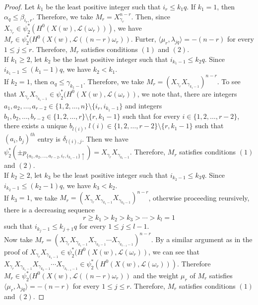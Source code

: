 \documentclass[12pt,reqno]{amsart}
\numberwithin{equation}{section}
\theoremstyle{definition}
\begin{document}
\begin{proof}
	Let $k_{1}$ be the least positive integer such that $i_{r}\leq k_{1}q$. If $k_{1}=1$, then $\alpha_{q}\leq \beta_{i_{r},r}$. Therefore, we take $M_{r}=X_{\gamma_{r}}^{n-r}$. Then, since $X_{\gamma_{r}}\in \psi_{2}^{*}(H^{0}(X(w),\mathcal{L}(\omega_{r})))$, we have $M_{r}\in \psi_{2}^{*}(H^{0}(X(w),\mathcal{L}((n-r)\omega_{r}))$. Furter, $\langle\mu_{r},\lambda_{jq}\rangle=-(n-r)$ for every $1\leq j\leq r$. Therefore, $M_{r}$ satisfies conditions $(1)$ and $(2)$.\\
	If $k_{1}\geq 2$, let $k_{2}$ be the least positive integer such that $i_{k_{1}-1}\leq k_{2}q$. Since $i_{k_{1}-1}\leq (k_{1}-1)q$, we have $k_{2}<k_{1}$.\\ If $k_{2}=1$, then $\alpha_{q}\leq \gamma_{k_{1}-1}$. Therefore, we take $M_{r}=(X_{\gamma_{r}}X_{\gamma_{k_{1}-1}})^{n-r}$. 
	To see that $X_{\gamma_{r}}X_{\gamma_{k_{1}-1}}\in \psi_{2}^{*}(H^{0}(X(w),\mathcal{L}(\omega_{r}))$, we note that, there are integers $a_{1},a_{2},\ldots,a_{r-2}\in \{1,2,\ldots,n\}\setminus\{i_{r},i_{k_{1}-1}\}$ and integers $b_{1},b_{2},\ldots,b_{r-2}\in\{1,2,\ldots,r\}\setminus\{r,k_{1}-1\}$ such that for every $i\in \{1,2,\ldots,r-2\}$, there exists a unique $b_{l(i)}$, $l(i)\in\{1,2,\ldots,r-2\}\setminus\{r,k_{1}-1\}$ such that $(a_{i},b_{j})^{th}$ entry is $\delta_{l(i),j}$. Then we have $\psi_{2}^{*}(\pm p_{\{a_{1},a_{2},\ldots,a_{r-2},i_{r},i_{k_{1}-1}\}\uparrow})=X_{\gamma_{r}}X_{\gamma_{k_{1}-1}}$.
	Therefore, $M_{r}$ satisfies conditions $(1)$ and $(2)$. \\
	If $k_{2}\geq 2$, let $k_{3}$ be the least positive integer such that $i_{k_{2}-1}\leq k_{3}q$. Since $i_{k_{2}-1}\leq (k_{2}-1)q$, we have $k_{3}<k_{2}$.\\
	If $k_{3}=1$, we take $M_{r}=(X_{\gamma_{r}}X_{\gamma_{k_{1}-1}}X_{\gamma_{k_{2}-1}})^{n-r}$, otherwise proceeding reursively, there is a decreasing sequence 
	$$r\geq k_{1}>k_{2}>k_{3}>\cdots>k_{l}=1$$
	such that $i_{k_{j}-1}\leq k_{j+1}q$ for every $1\leq j\leq l-1$. \\
	Now take $M_{r}=(X_{\gamma_{r}}X_{\gamma_{k_{1}-1}}X_{\gamma_{k_{2}-1}}\cdots X_{\gamma_{k_{l-1}-1}})^{n-r}$. 
	By a similar argument as in the proof of $X_{\gamma_{r}}X_{\gamma_{k_{1}-1}}\in \psi_{2}^{*}(H^{0}(X(w),\mathcal{L}(\omega_{r}))$, we can see that  $X_{\gamma_{r}}X_{\gamma_{k_{1}-1}}X_{\gamma_{k_{2}-1}}\cdots X_{\gamma_{k_{l-1}-1}}\in \psi_{2}^{*}(H^{0}(X(w),\mathcal{L}(\omega_{r})))$.
	Therefore $M_{r}\in \psi_{2}^{*}(H^{0}(X(w),\mathcal{L}((n-r)\omega_{r}))$ and the weight $\mu_{r}$ of $M_{r}$ satisfies $\langle\mu_{r},\lambda_{jq}\rangle=-(n-r)$ for every $1\leq j\leq r$. Therefore, $M_{r}$ satisfies conditions $(1)$ and $(2)$.
\end{proof}
\end{document}
